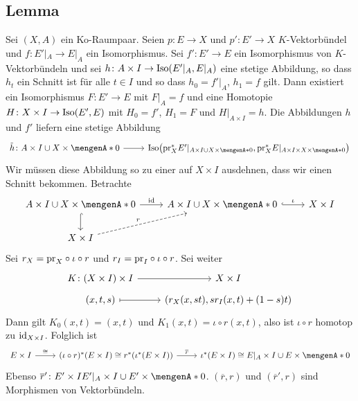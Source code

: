 \subsection[Lemma über die Existenz eines Bündelisomorphismus und einer Homotopie]{Lemma} %
\label{sub:33}
Sei $(X,A)$ ein Ko-Raumpaar. Seien $p \colon E \to X$ und $p' \colon E' \to X$ $K$-Vektorbündel und $f \colon E'|_A \to E|_A$ ein Isomorphismus. Sei $f' \colon E' \to E$ ein
Isomorphismus von $K$-Vektorbündeln und sei $h \colon A \times I \to \operatorname{Iso}(E'|_A,E|_A)$ eine stetige Abbildung, so dass $h_t$ ein Schnitt ist für alle $t \in I$ und so dass
$h_0=f'|_A$, $h_1=f$ gilt. Dann existiert ein Isomorphismus $F \colon E' \to E$ mit $F|_A=f$ und eine Homotopie $H \colon X \times I \to \operatorname{Iso}(E',E)$ mit $H_0=f'$, $H_1=F$ und
$H|_{A\times I}=h$.
Die Abbildungen $h$ und $f'$ liefern eine stetige Abbildung 
\[
	\begin{tikzcd}
		\tilde{h} \colon A \times I \cup X \times \set{0} \rar & \Iso \enbrace*{\pr_X^* E'|_{A \times I \cup X \times \set{0} },\pr_X^* E|_{A \times I \times X \times 
		\set{0}}} 
	\end{tikzcd}
\]
Wir müssen diese Abbildung so zu einer auf $X \times I$ ausdehnen, dass wir einen Schnitt bekommen. Betrachte 
\[
	\begin{tikzcd}
		A \times I \cup X \times \set{0} \rar["\id"] \dar[hook]& A \times I \cup X \times \set{0} \rar["\iota",hook] & X \times I\\  
		X \times I \urar[dashed,"r"]
	\end{tikzcd}
\]
Sei $r_X = \mathrm{pr}_X \circ \iota \circ r$ und $r_I = \mathrm{pr}_I \circ \iota \circ r$. Sei weiter 
\[
	\begin{tikzcd}[row sep=tiny]
		K \colon (X \times I) \times I \rar &  X \times I \\
		(x,t,s) \rar[mapsto] & \enbrace*{r_X(x,st), s r_I(x,t) + (1-s)t} 
	\end{tikzcd}
\]
Dann gilt $K_0(x,t)=(x,t)$ und $K_1(x,t)= \iota \circ r(x,t)$, also ist $\iota \circ r$ homotop zu $\operatorname{id}_{X \times I}$. Folglich ist
\[
	\begin{tikzcd}
		E \times I \rar["\cong"] &(\iota \circ r)^*(E \times I) \cong r^* \enbrace*{\iota^*(E \times I)} \rar["\overline{r}"] & \iota^*(E \times I) \cong E|_A \times I \cup E 
		\times \set{0} 
	\end{tikzcd}
\]
Ebenso $\overline{r}' \colon E' \times I E'|_A \times I \cup E' \times \set{0}$. $(\overline{r},r)$ und $(\overline{r}',r)$ sind Morphismen von Vektorbündeln.
